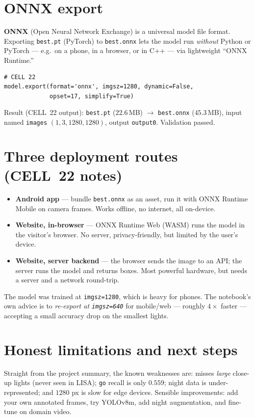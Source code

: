 \section{ONNX export}
\begin{keyconcept}
\textbf{ONNX} (Open Neural Network Exchange) is a universal model file
format. Exporting \texttt{best.pt} (PyTorch) to \texttt{best.onnx} lets
the model run \emph{without} Python or PyTorch --- e.g.\ on a phone, in a
browser, or in C++ --- via lightweight ``ONNX Runtime.''
\end{keyconcept}

\begin{verbatim}
# CELL 22
model.export(format='onnx', imgsz=1280, dynamic=False,
             opset=17, simplify=True)
\end{verbatim}

\noindent
Result (CELL~22 output): \texttt{best.pt} ($22.6$\,MB) $\rightarrow$
\texttt{best.onnx} ($45.3$\,MB), input named \texttt{images}
$(1,3,1280,1280)$, output \texttt{output0}. Validation passed.

\section{Three deployment routes (CELL~22 notes)}
\begin{itemize}
  \item \textbf{Android app} --- bundle \texttt{best.onnx} as an asset,
        run it with ONNX Runtime Mobile on camera frames. Works offline,
        no internet, all on-device.
  \item \textbf{Website, in-browser} --- ONNX Runtime Web (WASM) runs the
        model in the visitor's browser. No server, privacy-friendly,
        but limited by the user's device.
  \item \textbf{Website, server backend} --- the browser sends the image
        to an API; the server runs the model and returns boxes. Most
        powerful hardware, but needs a server and a network round-trip.
\end{itemize}

\begin{warningbox}
The model was trained at \texttt{imgsz=1280}, which is heavy for phones.
The notebook's own advice is to \emph{re-export at \texttt{imgsz=640}}
for mobile/web --- roughly $4\times$ faster --- accepting a small accuracy
drop on the smallest lights.
\end{warningbox}

\section{Honest limitations and next steps}
Straight from the project summary, the known weaknesses are: misses
\emph{large} close-up lights (never seen in LISA); \texttt{go} recall is
only $0.559$; night data is under-represented; and $1280$ px is slow for
edge devices. Sensible improvements: add your own annotated frames, try
YOLOv8m, add night augmentation, and fine-tune on domain video.


